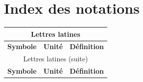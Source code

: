 \chapter*{Index des notations}\label{chap:IndexNotations}

\begin{center}
    \begin{longtable}{p{} @{} p{} @{} p{}}
        \multicolumn{3}{c}{Lettres latines}  \\\hline
        \textbf{Symbole} & \textbf{Unité} & \textbf{Définition} \\\hline\hline \endfirsthead
        \multicolumn{3}{c}{Lettres latines (suite)}  \\\hline
        \textbf{Symbole} & \textbf{Unité} & \textbf{Définition} \\\hline\hline \endhead
		

\end{longtable}
\end{center}

